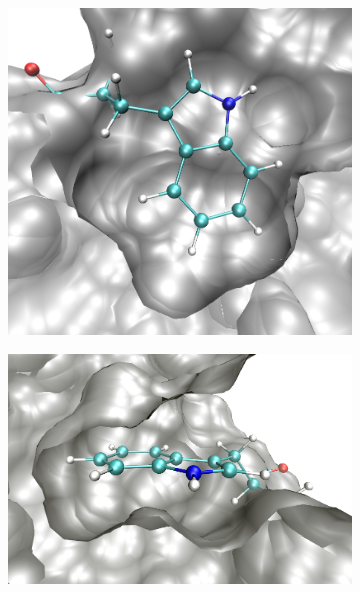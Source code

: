 \begin{figure}
    \centering
    \begin{subfigure}[b]{0.3\textwidth}
        \centering
        \includegraphics[width=\textwidth,height=\textheight,keepaspectratio]{figures/mutation_side_chain_images/in_pocket_out_of_plane.png}
        \caption{}
        \label{figure:mutation_side_chain_images/in_pocket_out_of_plane}
    \end{subfigure}
    \hspace{0.1\textwidth}
    \begin{subfigure}[b]{0.3\textwidth}
        \centering
        \includegraphics[width=\textwidth,height=\textheight,keepaspectratio]{figures/mutation_side_chain_images/in_pocket_in_plane.png}

\end{subfigure}
\end{figure}
